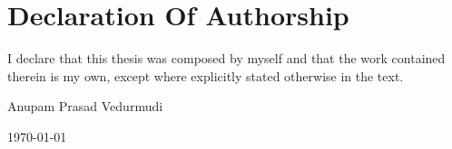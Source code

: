 \chapter*{Declaration Of Authorship}

\noindent I declare that this thesis was composed by myself and that the work contained therein is  my own, except where explicitly stated otherwise in the text.


\vspace{\baselineskip}
\vspace{\baselineskip}

\noindent Anupam Prasad Vedurmudi

\noindent\today